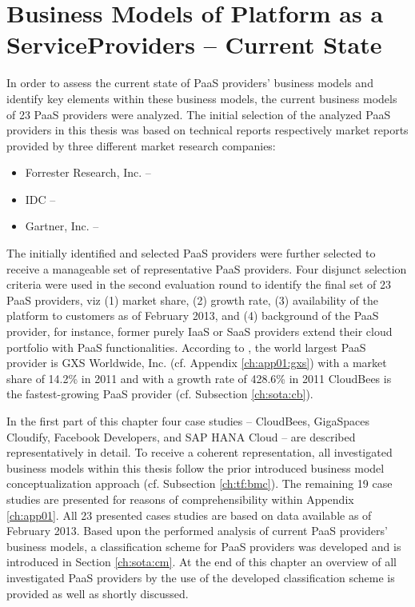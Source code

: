 \chapter[Business Models of Platform as a Service Providers -- Current State]{Business Models of Platform as a Service\protect\linebreak Providers -- Current State}\label{ch:sota}

In order to assess the current state of \ac{PaaS} providers' business models and identify key elements within these business models, the current business models of 23 \ac{PaaS} providers were analyzed. The initial selection of the analyzed \ac{PaaS} providers in this thesis was based on technical reports respectively market reports provided by three different market research companies:
\begin{itemize}[parsep=0pt, topsep=0pt, itemsep=0pt]
	\item Forrester Research, Inc. -- \citet{Rymer2011,Ried2011a}
	\item \ac{IDC} -- \citet{Bradshaw2012,Hendrick2012, Hendrick2012a}
	\item Gartner, Inc. -- \citet{Smith2012}
\end{itemize}
The initially identified and selected \ac{PaaS} providers were further selected to receive a manageable set of representative \ac{PaaS} providers. Four disjunct selection criteria were used in the second evaluation round to identify the final set of 23 \ac{PaaS} providers, viz (1) market share, (2) growth rate, (3) availability of the platform to customers as of February 2013, and (4) background of the \ac{PaaS} provider, for instance, former purely \ac{IaaS} or \ac{SaaS} providers extend their cloud portfolio with \ac{PaaS} functionalities. According to \citet{Hendrick2012}, the world largest \ac{PaaS} provider is GXS Worldwide, Inc. (cf. Appendix \ref{ch:app01:gxs}) with a market share of 14.2\% in 2011 and with a growth rate of 428.6\% in 2011 CloudBees  is the fastest-growing \ac{PaaS} provider (cf. Subsection \ref{ch:sota:cb}).

In the first part of this chapter four case studies -- CloudBees, GigaSpaces Cloudify, Facebook Developers, and SAP HANA Cloud -- are described representatively in detail. To receive a coherent representation, all investigated business models within this thesis follow the prior introduced business model conceptualization approach (cf. Subsection \ref{ch:tf:bmc}). The remaining 19 case studies are presented for reasons of comprehensibility within Appendix \ref{ch:app01}. All 23 presented cases studies are based on data available as of February 2013. Based upon the performed analysis of current \ac{PaaS} providers' business models, a classification scheme for \ac{PaaS} providers was developed and is introduced in Section \ref{ch:sota:cm}. At the end of this chapter an overview of all investigated \ac{PaaS} providers by the use of the developed classification scheme is provided as well as shortly discussed.

